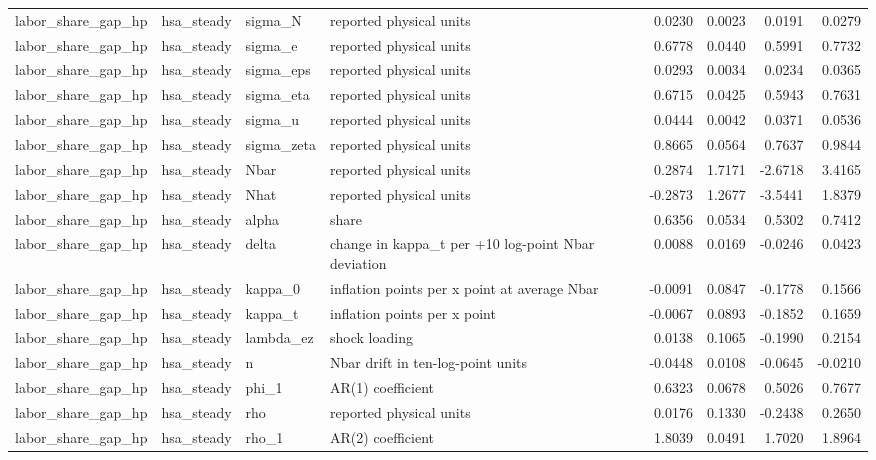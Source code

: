 \begin{tabular}{llllrrrr}
labor\_share\_gap\_hp & hsa\_steady & sigma\_N & reported physical units & 0.0230 & 0.0023 & 0.0191 & 0.0279 \\
labor\_share\_gap\_hp & hsa\_steady & sigma\_e & reported physical units & 0.6778 & 0.0440 & 0.5991 & 0.7732 \\
labor\_share\_gap\_hp & hsa\_steady & sigma\_eps & reported physical units & 0.0293 & 0.0034 & 0.0234 & 0.0365 \\
labor\_share\_gap\_hp & hsa\_steady & sigma\_eta & reported physical units & 0.6715 & 0.0425 & 0.5943 & 0.7631 \\
labor\_share\_gap\_hp & hsa\_steady & sigma\_u & reported physical units & 0.0444 & 0.0042 & 0.0371 & 0.0536 \\
labor\_share\_gap\_hp & hsa\_steady & sigma\_zeta & reported physical units & 0.8665 & 0.0564 & 0.7637 & 0.9844 \\
labor\_share\_gap\_hp & hsa\_steady & Nbar & reported physical units & 0.2874 & 1.7171 & -2.6718 & 3.4165 \\
labor\_share\_gap\_hp & hsa\_steady & Nhat & reported physical units & -0.2873 & 1.2677 & -3.5441 & 1.8379 \\
labor\_share\_gap\_hp & hsa\_steady & alpha & share & 0.6356 & 0.0534 & 0.5302 & 0.7412 \\
labor\_share\_gap\_hp & hsa\_steady & delta & change in kappa\_t per +10 log-point Nbar deviation & 0.0088 & 0.0169 & -0.0246 & 0.0423 \\
labor\_share\_gap\_hp & hsa\_steady & kappa\_0 & inflation points per x point at average Nbar & -0.0091 & 0.0847 & -0.1778 & 0.1566 \\
labor\_share\_gap\_hp & hsa\_steady & kappa\_t & inflation points per x point & -0.0067 & 0.0893 & -0.1852 & 0.1659 \\
labor\_share\_gap\_hp & hsa\_steady & lambda\_ez & shock loading & 0.0138 & 0.1065 & -0.1990 & 0.2154 \\
labor\_share\_gap\_hp & hsa\_steady & n & Nbar drift in ten-log-point units & -0.0448 & 0.0108 & -0.0645 & -0.0210 \\
labor\_share\_gap\_hp & hsa\_steady & phi\_1 & AR(1) coefficient & 0.6323 & 0.0678 & 0.5026 & 0.7677 \\
labor\_share\_gap\_hp & hsa\_steady & rho & reported physical units & 0.0176 & 0.1330 & -0.2438 & 0.2650 \\
labor\_share\_gap\_hp & hsa\_steady & rho\_1 & AR(2) coefficient & 1.8039 & 0.0491 & 1.7020 & 1.8964 \\

\end{tabular}
